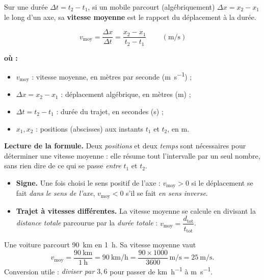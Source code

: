 \documentclass[11pt,a4paper]{article}
\newenvironment{ou}{%
  \par\smallskip\noindent\textbf{où :}\nopagebreak
  \begin{itemize}[leftmargin=1.8em,topsep=2pt,itemsep=1.5pt,parsep=0pt]}%
  {\end{itemize}}
\newcommand{\ms}{\si{\metre\per\second}}
\begin{document}
\begin{definition}
Sur une durée $\Delta t = t_2 - t_1$, si un mobile parcourt (algébriquement)
$\Delta x = x_2 - x_1$ le long d'un axe, sa \textbf{vitesse moyenne} est le rapport du
déplacement à la durée.
\end{definition}

\begin{formule}
\[ \boxed{\,v_{\text{moy}}=\dfrac{\Delta x}{\Delta t}=\dfrac{x_2-x_1}{t_2-t_1}\,}\qquad(\ms) \]
\begin{ou}
  \item $v_{\text{moy}}$ : vitesse moyenne, en mètres par seconde (\si{\metre\per\second}) ;
  \item $\Delta x = x_2-x_1$ : déplacement algébrique, en mètres (\si{\metre}) ;
  \item $\Delta t = t_2-t_1$ : durée du trajet, en secondes (\si{\second}) ;
  \item $x_1,x_2$ : positions (abscisses) aux instants $t_1$ et $t_2$, en \si{\metre}.
\end{ou}
\end{formule}

\noindent\textbf{Lecture de la formule.} Deux \emph{positions} et deux \emph{temps} sont
nécessaires pour déterminer une vitesse moyenne : elle résume tout l'intervalle par
un seul nombre, sans rien dire de ce qui se passe \emph{entre} $t_1$ et $t_2$.

\begin{itemize}[leftmargin=1.6em]
  \item \textbf{Signe.} Une fois choisi le sens positif de l'axe : $v_{\text{moy}}>0$ si le déplacement se fait \emph{dans le sens de l'axe}, $v_{\text{moy}}<0$ s'il se fait \emph{en sens inverse}.
  \item \textbf{Trajet à vitesses différentes.} La vitesse moyenne se calcule en divisant la \emph{distance totale} parcourue par la \emph{durée totale} : $v_{\text{moy}}=\dfrac{d_{\text{tot}}}{t_{\text{tot}}}$.
\end{itemize}

\begin{exemple}
Une voiture parcourt \qty{90}{\kilo\metre} en \qty{1}{\hour}. Sa vitesse moyenne vaut
\[ v_{\text{moy}}=\frac{\qty{90}{\kilo\metre}}{\qty{1}{\hour}}=\qty{90}{\kilo\metre\per\hour}
   =\frac{\num{90}\times\num{1000}}{\num{3600}}\,\ms = \qty{25}{\metre\per\second}. \]
Conversion utile : \emph{diviser par $3{,}6$} pour passer de \si{\kilo\metre\per\hour} à \ms.
\end{exemple}
\end{document}
